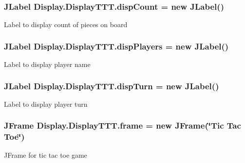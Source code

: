 \subsubsection[{disp\+Count}]{\setlength{\rightskip}{0pt plus 5cm}J\+Label Display.\+Display\+T\+T\+T.\+disp\+Count = new J\+Label()\hspace{0.3cm}{\ttfamily [private]}}\label{class_display_1_1_display_t_t_t_afbec846dfebaa4c2640cd270ec21c8b9}
Label to display count of pieces on board \hypertarget{class_display_1_1_display_t_t_t_a2f2eeba39f4aa0dcc00ef6b72e2b6c66}{}
\subsubsection[{disp\+Players}]{\setlength{\rightskip}{0pt plus 5cm}J\+Label Display.\+Display\+T\+T\+T.\+disp\+Players = new J\+Label()\hspace{0.3cm}{\ttfamily [private]}}\label{class_display_1_1_display_t_t_t_a2f2eeba39f4aa0dcc00ef6b72e2b6c66}
Label to display player name \hypertarget{class_display_1_1_display_t_t_t_a22f3ef7e7b2123a2b900bc8511bdd474}{}
\subsubsection[{disp\+Turn}]{\setlength{\rightskip}{0pt plus 5cm}J\+Label Display.\+Display\+T\+T\+T.\+disp\+Turn = new J\+Label()\hspace{0.3cm}{\ttfamily [private]}}\label{class_display_1_1_display_t_t_t_a22f3ef7e7b2123a2b900bc8511bdd474}
Label to display player turn \hypertarget{class_display_1_1_display_t_t_t_ab4d0cb92c4459675e8abd22f8ad4161f}{}
\subsubsection[{frame}]{\setlength{\rightskip}{0pt plus 5cm}J\+Frame Display.\+Display\+T\+T\+T.\+frame = new J\+Frame(\char`\"{}Tic Tac Toe\char`\"{})\hspace{0.3cm}{\ttfamily [private]}}\label{class_display_1_1_display_t_t_t_ab4d0cb92c4459675e8abd22f8ad4161f}
J\+Frame for tic tac toe game \hypertarget{class_display_1_1_display_t_t_t_a2e4a57cf17355b6a63f5b9d4e9e74de4}{}
